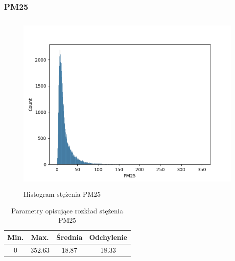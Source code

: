 \documentclass[18pt, letterpaper]{article}
\begin{document}
\subsubsection{PM25}
\begin{figure}[H]
\centering
\includegraphics[width=120mm, height=90mm]{visualisations/histograms/PM25_hist.png}
\caption{Histogram stężenia PM25}
\end{figure}
\begin{table}[H]
\centering
\begin{tabular}{|c|c|c|c|}
\hline
Min.  & Max. & Średnia & Odchylenie \\ \hline
0 & 352.63 & 18.87   & 18.33      \\ \hline
\end{tabular}
\caption{Parametry opisujące rozkład stężenia PM25}
\end{table}
\end{document}
